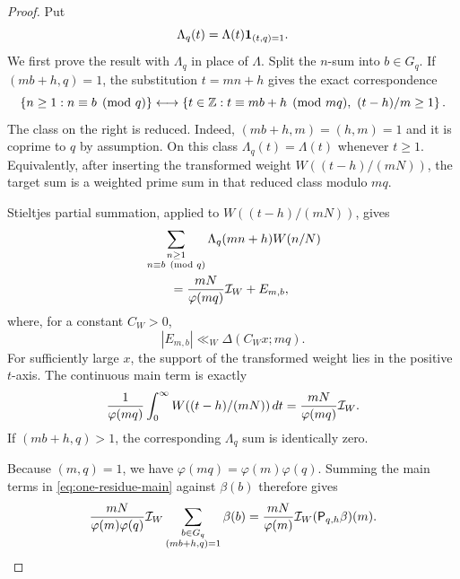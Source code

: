 \begin{proof}
Put
\begin{equation}\label{eq:Lambda-q}
 \Lambda_q(t)=\Lambda(t)\mathbf 1_{(t,q)=1}.
\end{equation}
We first prove the result with $\Lambda_q$ in place of $\Lambda$.
Split the $n$-sum into $b\in G_q$.  If $(mb+h,q)=1$, the substitution
$t=mn+h$ gives the exact correspondence
\begin{equation}\label{eq:AP-reindexing}
 \left\{n\geq1:n\equiv b\pmod q\right\}
 \longleftrightarrow
 \left\{t\in\mathbb Z:t\equiv mb+h\pmod{mq},\ (t-h)/m\geq1\right\}.
\end{equation}
The class on the right is reduced.  Indeed,
$(mb+h,m)=(h,m)=1$ and it is coprime to $q$ by assumption.  On this class
$\Lambda_q(t)=\Lambda(t)$ whenever $t\geq1$.  Equivalently, after inserting
the transformed weight $W((t-h)/(mN))$, the target sum is a weighted prime
sum in that reduced class modulo $mq$.

Stieltjes partial summation, applied to
$W((t-h)/(mN))$, gives
\begin{align}
 &\sum_{\substack{n\geq1\\n\equiv b\pmod q}}
  \Lambda_q(mn+h)W(n/N)
 \notag\\
 &\qquad=
 \frac{mN}{\varphi(mq)}\mathcal I_W+E_{m,b},
 \label{eq:one-residue-main}
\end{align}
where, for a constant $C_W>0$,
\begin{equation}\label{eq:one-residue-error}
 |E_{m,b}|\ll_W\Delta(C_Wx;mq).
\end{equation}
For sufficiently large $x$, the support of the transformed weight lies in
the positive $t$-axis.  The continuous main term is exactly
\[
 \frac1{\varphi(mq)}
 \int_0^\infty W((t-h)/(mN))\,dt
 =\frac{mN}{\varphi(mq)}\mathcal I_W.
\]
If $(mb+h,q)>1$, the corresponding $\Lambda_q$ sum is identically zero.

Because $(m,q)=1$, we have
$\varphi(mq)=\varphi(m)\varphi(q)$.  Summing the main terms in
\eqref{eq:one-residue-main} against $\beta(b)$ therefore gives
\begin{align*}
 \frac{mN}{\varphi(m)\varphi(q)}\mathcal I_W
 \sum_{\substack{b\in G_q\\(mb+h,q)=1}}\beta(b)
 =\frac{mN}{\varphi(m)}\mathcal I_W(\mathsf P_{q,h}\beta)(m).
\end{align*}


\end{proof}
